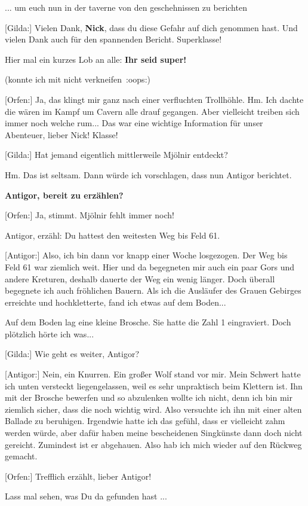 \documentclass[10pt, a4paper, oneside]{book}
\begin{document}
\begin{multicols}{2}
... um euch nun in der taverne von den geschehnissen zu berichten

[Gilda:] Vielen Dank, \textbf{Nick}, dass du diese Gefahr auf dich genommen hast. Und vielen Dank auch für den spannenden Bericht. Superklasse!

Hier mal ein kurzes Lob an alle: \textbf{Ihr seid super!}

(konnte ich mit nicht verkneifen :oops:)

[Orfen:] Ja, das klingt mir ganz nach einer verfluchten Trollhöhle. Hm. Ich dachte die wären im Kampf um Cavern alle drauf gegangen. Aber vielleicht treiben sich immer noch welche rum... Das war eine wichtige Information für unser Abenteuer, lieber Nick! Klasse!

[Gilda:] Hat jemand eigentlich mittlerweile Mjölnir entdeckt?

Hm. Das ist seltsam. Dann würde ich vorschlagen, dass nun Antigor berichtet.

\textbf{Antigor, bereit zu erzählen?}

[Orfen:] Ja, stimmt. Mjölnir fehlt immer noch!

Antigor, erzähl: Du hattest den weitesten Weg bis Feld 61.

[Antigor:] Also, ich bin dann vor knapp einer Woche losgezogen. Der Weg bis Feld 61 war ziemlich weit. Hier und da begegneten mir auch ein paar Gors und andere Kreturen, deshalb dauerte der Weg ein wenig länger. Doch überall begegnete ich auch fröhlichen Bauern. Als ich die Ausläufer des Grauen Gebirges erreichte und hochkletterte, fand ich etwas auf dem Boden...

Auf dem Boden lag eine kleine Brosche. Sie hatte die Zahl 1 eingraviert. Doch plötzlich hörte ich was...

[Gilda:] Wie geht es weiter, Antigor?

[Antigor:] Nein, ein Knurren. Ein großer Wolf stand vor mir. Mein Schwert hatte ich unten versteckt liegengelassen, weil es sehr unpraktisch beim Klettern ist. Ihn mit der Brosche bewerfen und so abzulenken wollte ich nicht, denn ich bin mir ziemlich sicher, dass die noch wichtig wird. Also versuchte ich ihn mit einer alten Ballade zu beruhigen. Irgendwie hatte ich das gefühl, dass er vielleicht zahm werden würde, aber dafür haben meine bescheidenen Singkünste dann doch nicht gereicht. Zumindest ist er abgehauen. Also hab ich mich wieder auf den Rückweg gemacht.

[Orfen:] Trefflich erzählt, lieber Antigor!

Lass mal sehen, was Du da gefunden hast ...


\end{multicols}
\end{document}
